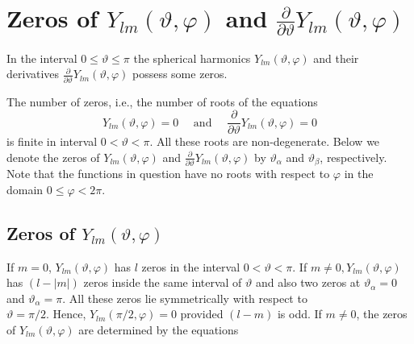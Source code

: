 \section{Zeros of $Y_{l m}(\vartheta, \varphi)$ and $\frac{\partial}{\partial \vartheta} Y_{l m}(\vartheta, \varphi)$}\label{sec:5.15}
In the interval $0 \leq \vartheta \leq \pi$ the spherical harmonics $Y_{l m}(\vartheta, \varphi)$ and their derivatives $\frac{\partial}{\partial \vartheta} Y_{l m}(\vartheta, \varphi)$ possess some zeros.

The number of zeros, i.e., the number of roots of the equations
\begin{equation}
Y_{l m}(\vartheta, \varphi)=0 \quad \text { and } \quad \frac{\partial}{\partial \vartheta} Y_{l m}(\vartheta, \varphi)=0 \label{eq:5:15:1}
\end{equation}
is finite in interval $0<\vartheta<\pi$. All these roots are non-degenerate. Below we denote the zeros of $Y_{l m}(\vartheta, \varphi)$ and $\frac{\partial}{\partial \vartheta} Y_{l m}(\vartheta, \varphi)$ by $\vartheta_{\alpha}$ and $\vartheta_{\beta}$, respectively. Note that the functions in question have no roots with respect to $\varphi$ in the domain $0 \leq \varphi<2 \pi$.

\subsection{Zeros of $Y_{l m}(\vartheta, \varphi)$}\label{sec:5.15.1}
If $m=0$, $Y_{l m}(\vartheta, \varphi)$ has $l$ zeros in the interval $0<\vartheta<\pi$. If $m \neq 0, Y_{l m}(\vartheta, \varphi)$ has $(l-|m|)$ zeros inside the same interval of $\vartheta$ and also two zeros at $\vartheta_{\alpha}=0$ and $\vartheta_{\alpha}=\pi$. All these zeros lie symmetrically with respect to\\
$\vartheta=\pi / 2$. Hence, $Y_{l m}(\pi / 2, \varphi)=0$ provided $(l-m)$ is odd. If $m \neq 0$, the zeros of $Y_{l m}(\vartheta, \varphi)$ are determined by the equations


